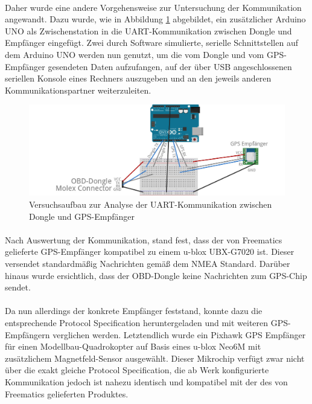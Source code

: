 \paragraph{}
Daher wurde eine andere Vorgehensweise zur Untersuchung der Kommunikation angewandt. Dazu wurde, wie in Abbildung \ref{fig:gpsAnalyse} abgebildet, ein zusätzlicher Arduino UNO als Zwischenstation in die UART-Kommunikation zwischen Dongle und Empfänger eingefügt. Zwei durch Software simulierte, serielle Schnittstellen auf dem Arduino UNO werden nun genutzt, um die vom Dongle und vom GPS-Empfänger gesendeten Daten aufzufangen, auf der über \ac{USB} angeschlossenen seriellen Konsole eines Rechners auszugeben und an den jeweils anderen Kommunikationspartner weiterzuleiten.
\begin{figure}
  \begin{center}
    \includegraphics[width=\textwidth]{./img/gpsVersuch}
    \caption{Versuchsaufbau zur Analyse der UART-Kommunikation zwischen Dongle und GPS-Empfänger}
    \label{fig:gpsAnalyse}
  \end{center}
\end{figure}
\paragraph{}
Nach Auswertung der Kommunikation, stand fest, dass der von Freematics gelieferte GPS-Empfänger kompatibel zu einem u-blox UBX-G7020 ist. Dieser versendet standardmäßig Nachrichten gemäß dem \ac{NMEA} Standard. Darüber hinaus wurde ersichtlich, dass der OBD-Dongle keine Nachrichten zum GPS-Chip sendet.
\paragraph{}
Da nun allerdings der konkrete Empfänger feststand, konnte dazu die entsprechende Protocol Specification heruntergeladen und mit weiteren GPS-Empfängern verglichen werden.
Letztendlich wurde ein Pixhawk GPS Empfänger für einen Modellbau-Quadrokopter auf Basis eines u-blox Neo6M mit zusätzlichem Magnetfeld-Sensor ausgewählt. Dieser Mikrochip verfügt zwar nicht über die exakt gleiche Protocol Specification, die ab Werk konfigurierte Kommunikation jedoch ist nahezu identisch und kompatibel mit der des von Freematics gelieferten Produktes.
